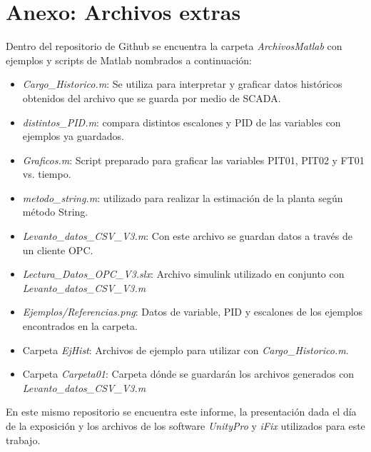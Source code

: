\section{Anexo: Archivos extras}
Dentro del repositorio de Github  se encuentra la carpeta \textit{ArchivosMatlab} con ejemplos y scripts de Matlab nombrados a continuación:
\begin{itemize}
	\item \textit{Cargo\_Historico.m}: Se utiliza para interpretar y graficar datos históricos obtenidos del archivo que se guarda por medio de SCADA.
	\item \textit{distintos\_PID.m}: compara distintos escalones y PID de las variables con ejemplos ya guardados.
	\item \textit{Graficos.m}: Script preparado para graficar las variables PIT01, PIT02 y FT01 vs. tiempo.
	\item \textit{metodo\_string.m}: utilizado para realizar la estimación de la planta según método String.
	\item \textit{Levanto\_datos\_CSV\_V3.m}: Con este archivo se guardan datos a través de un cliente OPC.
	\item \textit{Lectura\_Datos\_OPC\_V3.slx}:	Archivo simulink utilizado en conjunto con \textit{Levanto\_datos\_CSV\_V3.m}
	\item \textit{Ejemplos/Referencias.png}: Datos de variable, PID y escalones de los ejemplos encontrados en la carpeta.
	\item Carpeta \textit{EjHist}: Archivos de ejemplo para utilizar con \textit{Cargo\_Historico.m}.
	\item Carpeta \textit{Carpeta01}: Carpeta dónde se guardarán los archivos generados con  \textit{Levanto\_datos\_CSV\_V3.m}
\end{itemize}

En este mismo repositorio se encuentra este informe, la presentación dada el día de la exposición y los archivos de los software \textit{UnityPro} y \textit{iFix} utilizados para este trabajo.